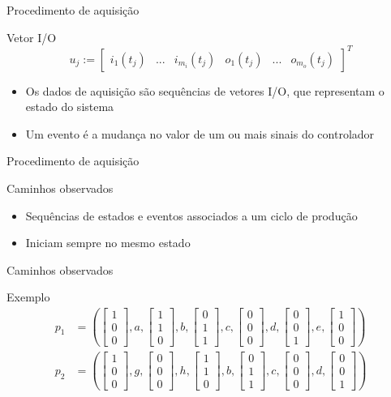\documentclass[xcolor=x11names,compress,framenumber]{beamer}
\newcommand{\colvector}[3]{\left[ \begin{array}{c}
		#1 \\ #2 \\ #3
	\end{array}\right]}
\newcommand{\doublecolvector}[6]{\left[ \begin{array}{cc}
		#1 & #4 \\ #2 & #5 \\ #3 & #6
	\end{array}\right]}
\renewcommand{\(}{\begin{columns}}
\renewcommand{\)}{\end{columns}}
\newcommand{\<}[1]{\begin{column}{#1}}
\renewcommand{\>}{\end{column}}
\begin{document}
\begin{frame}{Procedimento de aquisição}

\begin{block}{Vetor I/O}
\begin{equation*}
u_j:=\left[ \begin{array}{cccccc}
i_1(t_j) & ... & i_{m_i}(t_j) & o_1(t_j) & ... & o_{m_o}(t_j) 
\end{array}\right]^T 
\end{equation*}  
\end{block} 
\begin{block}{}
	\begin{itemize}
		\item Os dados de aquisição são sequências de vetores I/O, que representam o estado do sistema
		\item Um evento é a mudança no valor de um ou mais sinais do controlador
	\end{itemize}
	
\end{block}
\end{frame}

\begin{frame}{Procedimento de aquisição}
	\begin{block}{Caminhos observados}
		\begin{itemize}
			\item Sequências de estados e eventos associados a um ciclo de produção
			\item Iniciam sempre no mesmo estado
		\end{itemize}
	\end{block}
	
\end{frame}

\begin{frame}{Caminhos observados}
	\begin{block}{Exemplo}
		\begin{align*} 
		p_1&= \left( \colvector{1}{0}{0},a,\colvector{1}{1}{0},b,\colvector{0}{1}{1},c,\colvector{0}{0}{0},d,\colvector{0}{0}{1},e,\colvector{1}{0}{0}\right)\\
		p_2&= \left( \colvector{1}{0}{0},g,\colvector{0}{0}{0},h,\colvector{1}{1}{0},b,\colvector{0}{1}{1},c,\colvector{0}{0}{0},d,\colvector{0}{0}{1} \right)
		\end{align*}
	\end{block}
\end{frame}

		
\end{document}
